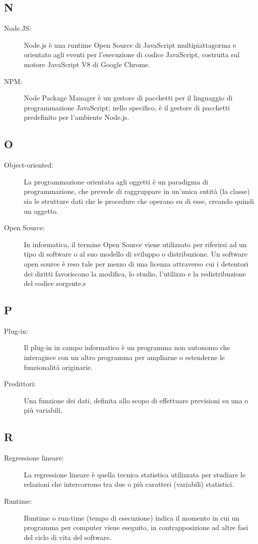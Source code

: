 \documentclass[../manuale-sviluppatore.tex]{subfiles}
\begin{document}
\subsection*{N}
\begin{description}
  \item[Node.JS:] Node.js è una runtime Open Source di JavaScript multipiattagorma e orientato agli eventi per l'esecuzione di codice JavaScript, costruita sul motore JavaScript V8 di Google Chrome.
  \item[NPM:] Node Package Manager è un gestore di pacchetti per il linguaggio di programmazione JavaScript; nello specifico, è il gestore di pacchetti predefinito per l'ambiente Node.js.
\end{description}

\subsection*{O}
\begin{description}
  \item[Object-oriented:] La programmazione orientata agli oggetti è un paradigma di programmazione, che prevede di raggruppare in un'unica entità (la classe) sia le strutture dati che le procedure che operano su di esse, creando quindi un oggetto.
  \item[Open Source:] In informatica, il termine Open Source viene utilizzato per riferirsi ad un tipo di software o al suo modello di sviluppo o distribuzione. Un software open source è reso tale per mezzo di una licenza attraverso cui i detentori dei diritti favoriscono la modifica, lo studio, l'utilizzo e la redistribuzione del codice sorgente.s
\end{description}

\subsection*{P}
\begin{description}
  \item[Plug-in:] Il plug-in in campo informatico è un programma non autonomo che interagisce con un altro programma per ampliarne o estenderne le funzionalità originarie.
  \item[Predittori:] Una funzione dei dati, definita allo scopo di effettuare previsioni su una o più variabili.
\end{description}

\subsection*{R}
\begin{description}
  \item[Regressione lineare:] La regressione lineare è quella tecnica statistica utilizzata per studiare le relazioni che intercorrono tra due o più caratteri (variabili) statistici.
  \item[Runtime:] Runtime o run-time (tempo di esecuzione) indica il momento in cui un programma per computer viene eseguito, in contrapposizione ad altre fasi del ciclo di vita del software. 
\end{description}
\end{document}
